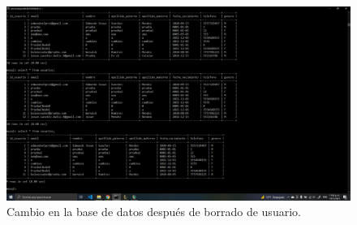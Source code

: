 \documentclass[11pt]{article}
\begin{document}
		\begin{figure}[H]
			\centering
			\includegraphics[scale=0.34]{resources/MOVIL3.png}
			\caption{Cambio en la base de datos después de borrado de usuario.}\label{fig:picture}
		\end{figure}
\end{document}
